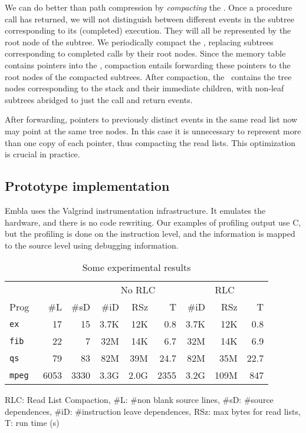 \documentclass[times, 10pt,twocolumn]{article}
\begin{document}
We can do better than path compression by {\em compacting} the \tracepile. 
Once a procedure call has returned, we will not distinguish between 
different events in the subtree corresponding to its (completed) 
execution. They will all be represented by the root node of the subtree.
We periodically compact the \tracepile, replacing subtrees
corresponding to completed calls by their root nodes. Since the 
memory table contains pointers into the \tracepile, compaction
entails forwarding these pointers to the root nodes of the compacted 
subtrees.
After compaction, the \tracepile\ contains the
tree nodes corresponding to the stack and their immediate children,
with non-leaf subtrees abridged to just the call and return events.

After forwarding, pointers to previously distinct events in the same read list 
now may point at the same 
tree nodes. In this case it is unnecessary to represent more than one 
copy of each pointer, thus compacting the read lists. This optimization is 
crucial in practice.

\subsection{Prototype implementation}

Embla uses the Valgrind instrumentation infrastructure.  It emulates
the hardware, and there is no code rewriting.  Our examples of profiling
output use C, but
the profiling is done on the instruction level, and the information is
mapped to the source level using debugging information.



\begin{table}
\begin{center} \newcommand{\sms}{\hskip0.4em}
\begin{tabular}{|@{\sms}l@{\sms}|r@{\sms}r|r@{\sms}r@{\sms}r|r@{\sms}r@{\sms}r|} \hline
 & & & \multicolumn{3}{|c|}{No RLC} & 
\multicolumn{3}{c|}{RLC} \\
Prog & \#L & \#sD & \#iD & RSz & T 
                              & \#iD & RSz & T \\ \hline
\tt ex & 17 & 15 & 3.7K & 12K & 0.8 & 3.7K & 12K & 0.8 \\
\tt fib & 22 & 7 & 32M & 14K & 6.7 & 32M & 14K & 6.9 \\
\tt qs & 79 & 83 & 82M & 39M & 24.7 & 82M & 35M & 22.7 \\
\tt mpeg & 6053 & 3330 & 3.3G & 2.0G & 2355 & 3.2G & 109M & 847 \\ \hline
\end{tabular}
\end{center}
RLC: Read List Compaction, 
\#L: \#non blank source lines, \#sD: \#source dependences, \#iD: 
\#instruction
leave dependences, RSz: max bytes for read lists, T: run time (s)
\caption{Some experimental results} \label{trex}
\end{table}
\end{document}
